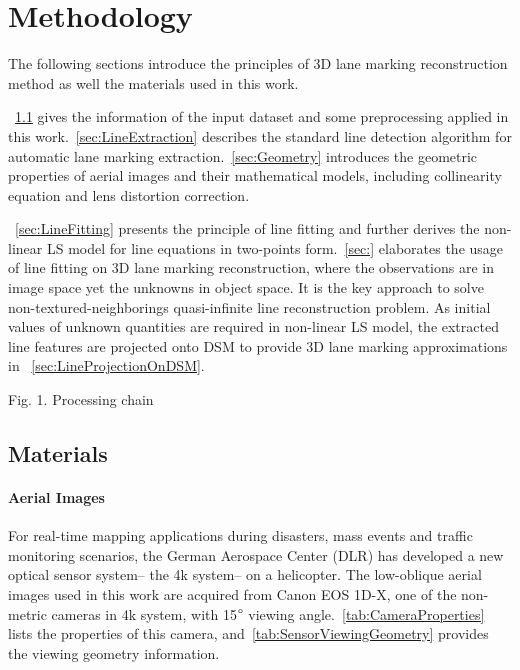 
\chapter{Methodology}
\label{chap:k2}

The following sections introduce the principles of 3D lane marking reconstruction method as well the materials used in this work.%

~\cref{sec:Materials} gives the information of the input dataset and some preprocessing applied in this work.~\cref{sec:LineExtraction} describes the standard line detection algorithm for automatic lane marking extraction.~\cref{sec:Geometry} introduces the geometric properties of aerial images and their mathematical models, including collinearity equation and lens distortion correction.

~\cref{sec:LineFitting} presents the principle of line fitting and further derives the non-linear LS model for line equations in two-points form.~\cref{sec:} elaborates the usage of line fitting on 3D lane marking reconstruction, where the observations are in image space yet the unknowns in object space. It is the key approach to solve non-textured-neighborings quasi-infinite line reconstruction problem. As initial values of unknown quantities are required in non-linear LS model, the extracted line features are projected onto DSM to provide 3D lane marking approximations in ~\cref{sec:LineProjectionOnDSM}.

Fig. 1. Processing chain

\clearpage

\section{Materials}
\label{sec:Materials}


\subsubsection{Aerial Images}

For real-time mapping applications during disasters, mass events and traffic monitoring scenarios, the German Aerospace Center (DLR) has developed a new optical sensor system-- the 4k system-- on a helicopter. %
The low-oblique aerial images used in this work are acquired from Canon EOS 1D-X, one of the non-metric cameras in 4k system, with 15$\degree$ viewing angle.~\cref{tab:CameraProperties} lists the properties of this camera, and~\cref{tab:SensorViewingGeometry} provides the viewing geometry information.
\newline

